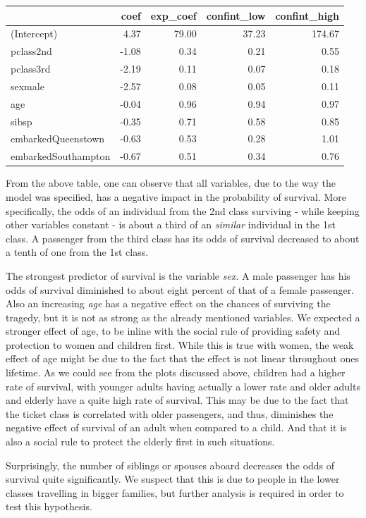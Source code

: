 \documentclass[12,]{article}
\begin{document}
\begin{longtable}[]{@{}lrrrr@{}}
\toprule
& coef & exp\_coef & confint\_low & confint\_high\tabularnewline
\midrule
\endhead
(Intercept) & 4.37 & 79.00 & 37.23 & 174.67\tabularnewline
pclass2nd & -1.08 & 0.34 & 0.21 & 0.55\tabularnewline
pclass3rd & -2.19 & 0.11 & 0.07 & 0.18\tabularnewline
sexmale & -2.57 & 0.08 & 0.05 & 0.11\tabularnewline
age & -0.04 & 0.96 & 0.94 & 0.97\tabularnewline
sibsp & -0.35 & 0.71 & 0.58 & 0.85\tabularnewline
embarkedQueenstown & -0.63 & 0.53 & 0.28 & 1.01\tabularnewline
embarkedSouthampton & -0.67 & 0.51 & 0.34 & 0.76\tabularnewline
\bottomrule
\end{longtable}

From the above table, one can observe that all variables, due to the way
the model was specified, has a negative impact in the probability of
survival. More specifically, the odds of an individual from the 2nd
class surviving - while keeping other variables constant - is about a
third of an \emph{similar} individual in the 1st class. A passenger from
the third class has its odds of survival decreased to about a tenth of
one from the 1st class.

The strongest predictor of survival is the variable \emph{sex}. A male
passenger has his odds of survival diminished to about eight percent of
that of a female passenger. Also an increasing \emph{age} has a negative
effect on the chances of surviving the tragedy, but it is not as strong
as the already mentioned variables. We expected a stronger effect of
age, to be inline with the social rule of providing safety and
protection to women and children first. While this is true with women,
the weak effect of age might be due to the fact that the effect is not
linear throughout ones lifetime. As we could see from the plots
discussed above, children had a higher rate of survival, with younger
adults having actually a lower rate and older adults and elderly have a
quite high rate of survival. This may be due to the fact that the ticket
class is correlated with older passengers, and thus, diminishes the
negative effect of survival of an adult when compared to a child. And
that it is also a social rule to protect the elderly first in such
situations.

Surprisingly, the number of siblings or spouses aboard decreases the
odds of survival quite significantly. We suspect that this is due to
people in the lower classes travelling in bigger families, but further
analysis is required in order to test this hypothesis.
\end{document}
